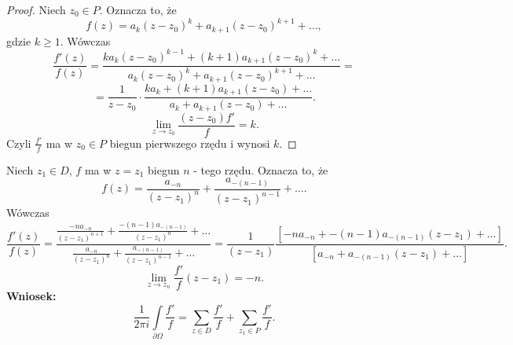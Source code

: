 \documentclass[../main.tex]{subfiles}
\begin{document}
\begin{proof}
    Niech $z_0\in P$. Oznacza to, że
    \[
        f(z) = a_k (z-z_0)^k + a_{k+1} (z-z_0)^{k+1} + \ldots
    ,\]
gdzie $k \ge 1$. Wówczas
\[
    \frac{f'(z)}{f(z)} = \frac{ka_k(z-z_0)^{k-1} + (k+1)a_{k+1}(z-z_0)^k + \ldots}{a_k(z-z_0)^k + a_{k+1}(z-z_0)^{k+1} + \ldots} =
\]
\[
    = \frac{1}{z-z_0}\cdot \frac{ka_k + (k+1)a_{k+1}(z-z_0) + \ldots}{a_k + a_{k+ 1}(z-z_0) + \ldots}
.\]
\[
    \lim\limits_{z\to z_0} \frac{(z-z_0)f'}{f} = k
.\]
Czyli $\frac{f'}{f}$ ma w $z_0\in P$ biegun pierwszego rzędu i wynosi $k$.
\end{proof}
Niech $z_1\in D$, $f$ ma w $z = z_1$ biegun $n$ - tego rzędu. Oznacza to, że
\[
    f(z) = \frac{a_{-n}}{(z-z_1)^n} + \frac{a_{-(n-1)}}{(z-z_1)^{n-1}} + \ldots
.\]
Wówczas
\[
    \frac{f'(z)}{f(z)} = \frac{\frac{-na_{-n}}{(z-z_1)^{n+1}} + \frac{-(n-1)a_{-(n-1)}}{(z-z_1)^n} + \ldots }{\frac{a_{-n}}{(z-z_1)^n} + \frac{a_{-(n-1)}}{(z-z_1)^{n-1}} + \ldots} = \frac{1}{(z-z_1)}\frac{\left[ -na_{-n} + -(n-1)a_{-(n-1)}(z-z_1) + \ldots \right] }{\left[ a_{-n} + a_{-(n-1)}(z-z_1) + \ldots \right] }
.\]
\[
    \lim\limits_{z\to z_n}\frac{f'}{f} (z-z_1) = -n
.\]
\textbf{Wniosek:}
\[
    \frac{1}{2\pi i}\int\limits_{\partial \Omega}\frac{f'}{f} = \sum_{z\in D} \frac{f'}{f} + \sum_{z_1\in P} \frac{f'}{f}
.\]
\end{document}
